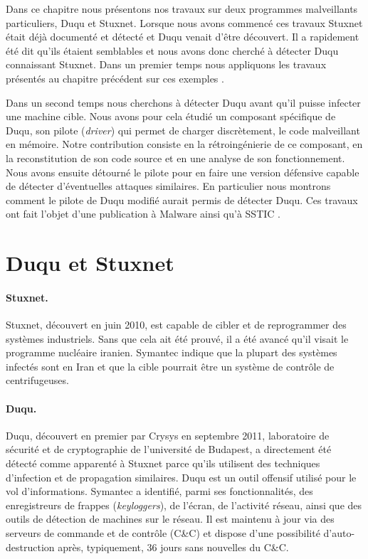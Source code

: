 Dans ce chapitre nous présentons nos travaux sur deux programmes malveillants particuliers, Duqu et Stuxnet.
Lorsque nous avons commencé ces travaux Stuxnet était déjà documenté et détecté et Duqu venait d'être découvert.
Il a rapidement été dit qu'ils étaient semblables et nous avons donc cherché à détecter Duqu connaissant Stuxnet.
Dans un premier temps nous appliquons les travaux présentés au chapitre précédent sur ces exemples \cite{REAT12,mal12}.

Dans un second temps nous cherchons à détecter Duqu avant qu'il puisse infecter une machine cible.
Nous avons pour cela étudié un composant spécifique de Duqu, son pilote (\emph{driver}) qui permet de charger discrètement, le code malveillant en mémoire.
Notre contribution consiste en la rétroingénierie de ce composant, en la reconstitution de son code source et en une analyse de son fonctionnement.
Nous avons ensuite détourné le pilote pour en faire une version défensive capable de détecter d'éventuelles attaques similaires.
En particulier nous montrons comment le pilote de Duqu modifié aurait permis de détecter Duqu.
Ces travaux ont fait l'objet d'une publication à Malware \cite{mal13} ainsi qu'à SSTIC \cite{sstic13}.


\section{Duqu et Stuxnet}
\paragraph{Stuxnet.}
Stuxnet, découvert en juin 2010, est capable de cibler et de reprogrammer des systèmes industriels.
Sans que cela ait été prouvé, il a été avancé qu'il visait le programme nucléaire iranien. 
Symantec \cite{SymantecStux2011} indique que la plupart des systèmes infectés sont en Iran et que la cible pourrait être un système de contrôle de centrifugeuses.

\paragraph{Duqu.}
Duqu, découvert en premier par Crysys \cite{CrysysDuquStuxnet} en septembre 2011, laboratoire de sécurité et de cryptographie de l'université de Budapest, a directement été détecté comme apparenté à Stuxnet parce qu'ils utilisent des techniques d'infection et de propagation similaires.
Duqu est un outil offensif utilisé pour le vol d'informations. Symantec \cite{SymantecDuqu2011} a identifié, parmi ses fonctionnalités, des enregistreurs de frappes (\emph{keyloggers}), de l'écran, de l'activité réseau, ainsi que des outils de détection de machines sur le réseau.
Il est maintenu à jour via des serveurs de commande et de contrôle (C\&C) et dispose d'une possibilité d'auto-destruction après, typiquement, 36 jours sans nouvelles du C\&C.

